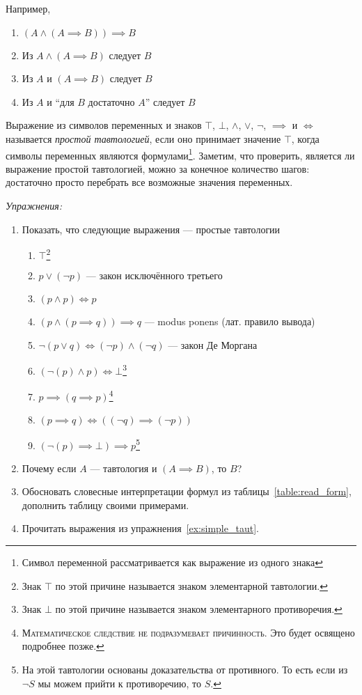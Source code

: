 Например,
\begin{enumerate}
	\item{}$(A\land (A\implies B))\implies B$
	\item{}Из $A\land (A\implies B)$ следует $B$
	\item{}Из $A$ и $(A\implies B)$ следует $B$
	\item{}Из $A$ и ``для $B$ достаточно $A$'' следует $B$
\end{enumerate}

Выражение из символов переменных и знаков $\top$, $\bot$, $\land$, $\lor$, $\lnot$,
$\implies$ и $\iff$ называется {\it простой тавтологией}, если
оно принимает значение $\top$, когда символы переменных являются формулами\footnote{
	Символ переменной рассматривается как выражение из одного знака
}.
Заметим, что проверить, является ли выражение простой тавтологией,
можно за конечное количество шагов: достаточно просто перебрать все возможные значения
переменных.

{\it Упражнения:}

\begin{enumerate}
	\item{}Показать, что следующие выражения --- простые тавтологии\label{ex:simple_taut}
	\begin{enumerate}
		\item{}$\top$\footnote{Знак $\top$ по этой причине называется
			знаком элементарной тавтологии.}
		\item{}$p\lor (\lnot p)$ --- закон исключённого третьего
		\item{}$(p\land p)\iff p$
		\item{}$(p\land (p\implies q))\implies q$ --- modus ponens (лат. правило вывода)
		\item{}$\lnot(p\lor q)\iff (\lnot p)\land (\lnot q)$ --- закон Де Моргана
		\item{}$(\lnot(p)\land p)\iff\bot$\footnote{
			Знак $\bot$ по этой причине называется
			знаком элементарного противоречия.}
		\item{}$p\implies (q\implies p)$\footnote{
			\textsc{Математическое следствие не подразумевает причинность.}
			Это будет освящено подробнее позже.
		}
		\item{}${(p\implies q)\iff ((\lnot q)\implies (\lnot p))}$
		\item{}$(\lnot(p)\implies\bot)\implies p$\footnote{На этой тавтологии основаны
			доказательства от противного. То есть если из $\lnot S$ мы можем прийти
			к противоречию, то $S$.}
	\end{enumerate}
	\item{}Почему если $A$ --- тавтология и $(A\implies B)$, то $B$?
	\item{}Обосновать словесные интерпретации формул из таблицы~\ref{table:read_form},
	дополнить таблицу своими примерами.
	\item{}Прочитать выражения из упражнения~\ref{ex:simple_taut}.
\end{enumerate}

